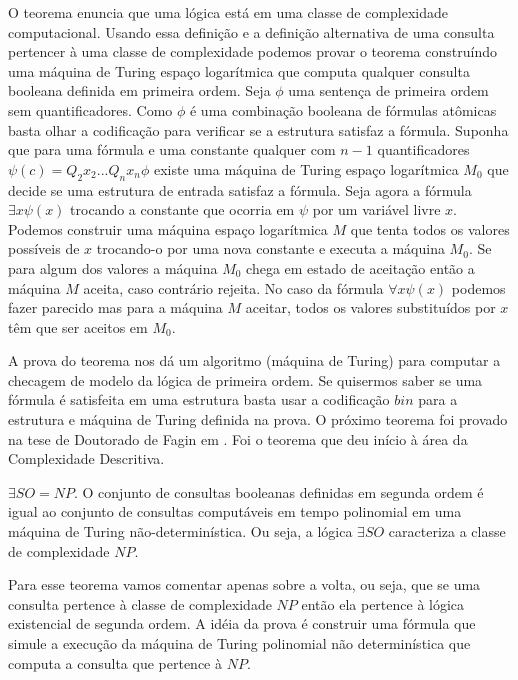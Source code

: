 O teorema enuncia que uma lógica está em uma classe de complexidade computacional. Usando essa definição e a definição alternativa de uma consulta pertencer à uma classe de complexidade podemos provar o teorema construíndo uma máquina de Turing espaço logarítmica que computa qualquer consulta booleana definida em primeira ordem. Seja $\phi$ uma sentença de primeira ordem sem quantificadores. Como $\phi$ é uma combinação booleana de fórmulas atômicas basta olhar a codificação para verificar se a estrutura satisfaz a fórmula. Suponha que para uma fórmula e uma constante qualquer com $n - 1$ quantificadores $\psi(c) = Q_2x_2...Q_nx_n\phi$ existe uma máquina de Turing espaço logarítmica $M_0$ que decide se uma estrutura de entrada satisfaz a fórmula. Seja agora a fórmula $\exists x \psi(x)$ trocando a constante que ocorria em $\psi$ por um variável livre $x$. Podemos construir uma máquina espaço logarítmica $M$ que tenta todos os valores possíveis de $x$ trocando-o por uma nova constante e executa a máquina $M_0$. Se para algum dos valores a máquina $M_0$ chega em estado de aceitação então a máquina $M$ aceita, caso contrário rejeita. No caso da fórmula $\forall x \psi(x)$ podemos fazer parecido mas para a máquina $M$ aceitar, todos os valores substituídos por $x$ têm que ser aceitos em $M_0$.

A prova do teorema nos dá um algoritmo (máquina de Turing) para computar a checagem de modelo da lógica de primeira ordem. Se quisermos saber se uma fórmula é satisfeita em uma estrutura basta usar a codificação $bin$ para a estrutura e máquina de Turing definida na prova.
O próximo teorema foi provado na tese de Doutorado de Fagin em \cite{fagin1973}.
Foi o teorema que deu início à área da Complexidade Descritiva.

\begin{teo}
$\exists SO = NP$. O conjunto de consultas booleanas definidas em segunda ordem é igual ao conjunto de consultas computáveis em tempo polinomial em uma máquina de Turing não-determinística. Ou seja, a lógica $\exists SO$ caracteriza a classe de complexidade $NP$.
\end{teo}

Para esse teorema vamos comentar apenas sobre a volta, ou seja, que se uma consulta pertence à classe de complexidade $NP$ então ela pertence à lógica existencial de segunda ordem. A idéia da prova é construir uma fórmula que simule a execução da máquina de Turing polinomial não determinística que computa a consulta que pertence à $NP$.

